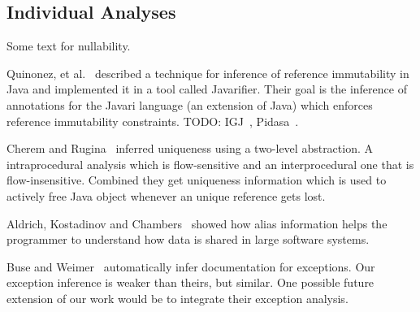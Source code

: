 \subsection{Individual Analyses}
Some text for nullability.

Quinonez, et al.~\cite{Javarifier} described a technique for inference of
reference immutability in Java and implemented it in a tool called {\sc
  Javarifier}. Their goal is the inference of annotations for the {\sc Javari}
language (an extension of Java) which enforces reference immutability
constraints. TODO: IGJ~\cite{IGJ}, Pidasa~\cite{Pidasa}.

Cherem and Rugina~\cite{UniquenessInference} inferred uniqueness using a two-level
abstraction. A intraprocedural analysis which is flow-sensitive and an interprocedural
one that is flow-insensitive. Combined they get uniqueness information
which is used to actively free Java object whenever an unique reference gets lost.

Aldrich, Kostadinov and Chambers~\cite{AliasJava} showed how alias information 
helps the programmer to understand how data is shared in large software systems.

Buse and Weimer~\cite{autodoc} automatically infer documentation for
exceptions.  Our exception inference is weaker than theirs, but similar.  One
possible future extension of our work would be to integrate their exception
analysis.
